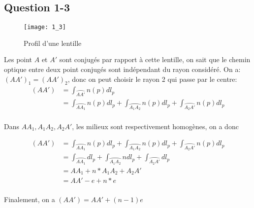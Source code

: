 \documentclass[a4paper,12pt]{book}
\begin{document}
\begin{CJK}{UTF8}{gbsn}
\renewcommand{\labelitemi}{$\blacktriangleright$}
\renewcommand{\labelitemii}{$\bullet$}


\section{Question 1-3}

\begin{figure}[h]
\begin{center}
\texttt{[image: 1\_3]}
\end{center}
\caption{Profil d'une lentille}
\end{figure}



Les point $A$ et $A'$ sont conjugés par rapport à cette lentille, on sait que
le chemin optique entre deux point conjugés sont indépendant du rayon considéré.
On a: $(AA')_1=(AA')_2$, donc on peut choisir le rayon 2 qui passe par le centre:
\begin{align*}
    (AA')&=\int_{\wideparen{AA'}}n(p)dl_p\\
    &=\int_{\wideparen{AA_1}}n(p)dl_p+\int_{\wideparen{A_1A_2}}n(p)dl_p+\int_{\wideparen{A_2A'}}n(p)dl_p\\
\end{align*}

Dans $AA_1, A_1A_2, A_2A'$, les milieux sont respectivement homogènes, on a donc

\begin{align*}
    (AA')&=\int_{\wideparen{AA_1}}n(p)dl_p+\int_{\wideparen{A_1A_2}}n(p)dl_p+\int_{\wideparen{A_2A'}}n(p)dl_p\\
    &=\int_{\wideparen{AA_1}}dl_p+\int_{\wideparen{A_1A_2}}ndl_p+\int_{\wideparen{A_2A'}}dl_p\\
    &=AA_1+n*A_1A_2+A_2A'\\
    &=AA'-e+n*e\\
\end{align*}

Finalement, on a $\boxed{(AA')=AA'+(n-1)e}$

\end{CJK}
\end{document}
